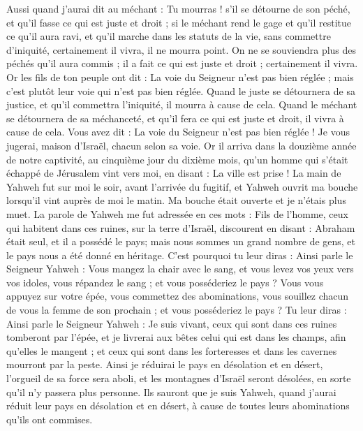 \begin{multicols}{2}
Aussi quand j'aurai dit au méchant : Tu mourras ! s'il se détourne de son péché, et qu'il fasse ce qui est juste et droit ;
si le méchant rend le gage et qu'il restitue ce qu'il aura ravi, et qu'il marche dans les statuts de la vie, sans commettre d'iniquité, certainement il vivra, il ne mourra point.
On ne se souviendra plus des péchés qu'il aura commis ; il a fait ce qui est juste et droit ; certainement il vivra.
Or les fils de ton peuple ont dit : La voie du Seigneur n'est pas bien réglée ; mais c'est plutôt leur voie qui n'est pas bien réglée.
Quand le juste se détournera de sa justice, et qu'il commettra l'iniquité, il mourra à cause de cela.
Quand le méchant se détournera de sa méchanceté, et qu'il fera ce qui est juste et droit, il vivra à cause de cela.
Vous avez dit : La voie du Seigneur n'est pas bien réglée ! Je vous jugerai, maison d'Israël, chacun selon sa voie.
Or il arriva dans la douzième année de notre captivité, au cinquième jour du dixième mois, qu'un homme qui s'était échappé de Jérusalem vint vers moi, en disant : La ville est prise !
La main de Yahweh fut sur moi le soir, avant l'arrivée du fugitif, et Yahweh ouvrit ma bouche lorsqu'il vint auprès de moi le matin. Ma bouche était ouverte et je n'étais plus muet.
La parole de Yahweh me fut adressée en ces mots :
Fils de l'homme, ceux qui habitent dans ces ruines, sur la terre d'Israël, discourent en disant : Abraham était seul, et il a possédé le pays; mais nous sommes un grand nombre de gens, et le pays nous a été donné en héritage.
C'est pourquoi tu leur diras : Ainsi parle le Seigneur Yahweh : Vous mangez la chair avec le sang, et vous levez vos yeux vers vos idoles, vous répandez le sang ; et vous posséderiez le pays ?
Vous vous appuyez sur votre épée, vous commettez des abominations, vous souillez chacun de vous la femme de son prochain ; et vous posséderiez le pays ?
Tu leur diras : Ainsi parle le Seigneur Yahweh : Je suis vivant, ceux qui sont dans ces ruines tomberont par l'épée, et je livrerai aux bêtes celui qui est dans les champs, afin qu'elles le mangent ; et ceux qui sont dans les forteresses et dans les cavernes mourront par la peste.
Ainsi je réduirai le pays en désolation et en désert, l'orgueil de sa force sera aboli, et les montagnes d'Israël seront désolées, en sorte qu'il n'y passera plus personne.
Ils sauront que je suis Yahweh, quand j'aurai réduit leur pays en désolation et en désert, à cause de toutes leurs abominations qu'ils ont commises.

\end{multicols}
